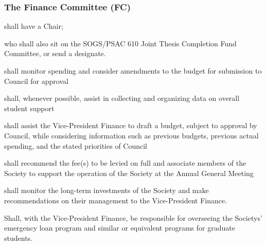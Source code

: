 \subsubsection{The Finance Committee (FC)}
\begin{longenum}[ label*=\thesubsubsection.\arabic*., align=left]
	\item shall have a Chair;
	\begin{longenum}[ label*=\arabic*., align=left]
		\item who shall also sit on the SOGS/PSAC 610 Joint Thesis Completion Fund Committee, or send a designate.
		\end{longenum}
    \item shall monitor spending and consider amendments to the budget for submission to Council for approval
    \item shall, whenever possible, assist in collecting and organizing data on overall student support
    \item shall assist the Vice-President Finance to draft a budget, subject to approval by Council, while considering information such as previous budgets, previous actual spending, and the stated priorities of Council
    \item shall recommend the fee(s) to be levied on full and associate members of the Society to support the operation of the Society at the Annual General Meeting
    \item shall monitor the long-term investments of the Society and make recommendations on their management to the Vice-President Finance.
   \item Shall, with the Vice-President Finance, be responsible for overseeing the Societys' emergency loan program and similar or equivalent programs for graduate students.
\end{longenum}


